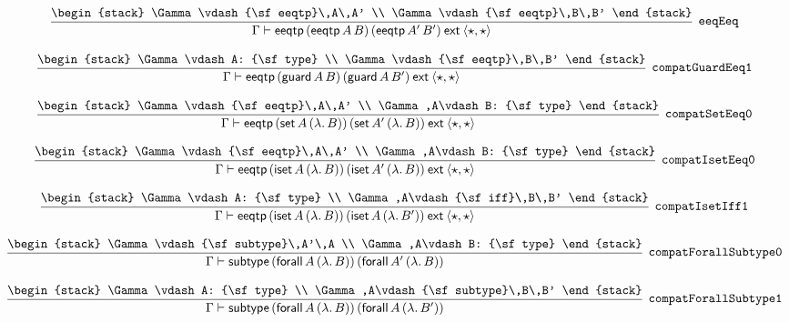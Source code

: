 \[
\infer[{\tt eeqEeq}]{\Gamma \vdash {\sf eeqtp}\,({\sf eeqtp}\,A\,B)\,({\sf eeqtp}\,A'\,B')\:{\sf ext}\:\langle \star ,\star \rangle }{
\begin{stack}
\Gamma \vdash {\sf eeqtp}\,A\,A'
\\
\Gamma \vdash {\sf eeqtp}\,B\,B'
\end{stack}}
\]

\[
\infer[{\tt compatGuardEeq1}]{\Gamma \vdash {\sf eeqtp}\,({\sf guard}\,A\,B)\,({\sf guard}\,A\,B')\:{\sf ext}\:\langle \star ,\star \rangle }{
\begin{stack}
\Gamma \vdash A: {\sf type}
\\
\Gamma \vdash {\sf eeqtp}\,B\,B'
\end{stack}}
\]

\[
\infer[{\tt compatSetEeq0}]{\Gamma \vdash {\sf eeqtp}\,({\sf set}\,A\,(\lambda .\,B))\,({\sf set}\,A'\,(\lambda .\,B))\:{\sf ext}\:\langle \star ,\star \rangle }{
\begin{stack}
\Gamma \vdash {\sf eeqtp}\,A\,A'
\\
\Gamma ,A\vdash B: {\sf type}
\end{stack}}
\]

\[
\infer[{\tt compatIsetEeq0}]{\Gamma \vdash {\sf eeqtp}\,({\sf iset}\,A\,(\lambda .\,B))\,({\sf iset}\,A'\,(\lambda .\,B))\:{\sf ext}\:\langle \star ,\star \rangle }{
\begin{stack}
\Gamma \vdash {\sf eeqtp}\,A\,A'
\\
\Gamma ,A\vdash B: {\sf type}
\end{stack}}
\]

\[
\infer[{\tt compatIsetIff1}]{\Gamma \vdash {\sf eeqtp}\,({\sf iset}\,A\,(\lambda .\,B))\,({\sf iset}\,A\,(\lambda .\,B'))\:{\sf ext}\:\langle \star ,\star \rangle }{
\begin{stack}
\Gamma \vdash A: {\sf type}
\\
\Gamma ,A\vdash {\sf iff}\,B\,B'
\end{stack}}
\]

\[
\infer[{\tt compatForallSubtype0}]{\Gamma \vdash {\sf subtype}\,({\sf forall}\,A\,(\lambda .\,B))\,({\sf forall}\,A'\,(\lambda .\,B))}{
\begin{stack}
\Gamma \vdash {\sf subtype}\,A'\,A
\\
\Gamma ,A\vdash B: {\sf type}
\end{stack}}
\]

\[
\infer[{\tt compatForallSubtype1}]{\Gamma \vdash {\sf subtype}\,({\sf forall}\,A\,(\lambda .\,B))\,({\sf forall}\,A\,(\lambda .\,B'))}{
\begin{stack}
\Gamma \vdash A: {\sf type}
\\
\Gamma ,A\vdash {\sf subtype}\,B\,B'
\end{stack}}
\]

